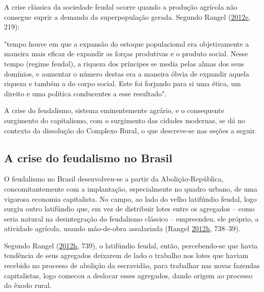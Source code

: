\documentclass[
	12pt,				%
	oneside,			%
	a4paper,			%
	chapter=TITLE,		%
	section=TITLE,		%
	english,			%
	brazil				%
	]{abntex2}
\begin{document}
A crise clássica da sociedade feudal ocorre quando a produção agrícola não
consegue suprir a demanda da superpopulação gerada. Segundo Rangel
(\protect\hyperlink{ref-rangel1961}{2012}\protect\hyperlink{ref-rangel1961}{e}, 219):
\begin{citacao} 
"tempo houve em que a expansão do estoque populacional era objetivamente a
maneira mais eficaz de expandir as forças produtivas e o produto social. Nesse
tempo (regime feudal), a riqueza dos príncipes se media pelas almas dos seus
domínios, e aumentar o número destas era a maneira óbvia de expandir aquela
riqueza e também a do corpo social. Este foi forjando para si uma ética, um
direito e uma política conducentes a esse resultado".
\end{citacao}
A crise do feudalismo, sistema eminentemente agrário, e o consequente surgimento
do capitalismo, com o surgimento das cidades modernas, se dá no contexto da
dissolução do Complexo Rural, o que descreve-se nas seções a seguir.

\hypertarget{a-crise-do-feudalismo-no-brasil}{%
\subsection{A crise do feudalismo no Brasil}\label{a-crise-do-feudalismo-no-brasil}}

O feudalismo no Brasil desenvolveu-se a partir da Abolição-República,
concomitantemente com a implantação, especialmente no quadro urbano, de uma
vigorosa economia capitalista. No campo, ao lado do velho latifúndio feudal,
logo surgiu outro latifúndio que, em vez de distribuir lotes entre os agregados
-- como seria natural na desintegração do feudalismo clássico -- empreendeu, ele
próprio, a atividade agrícola, usando mão-de-obra assalariada (Rangel \protect\hyperlink{ref-rangel1989}{2012}\protect\hyperlink{ref-rangel1989}{h}, 738--39).

Segundo Rangel (\protect\hyperlink{ref-rangel1989}{2012}\protect\hyperlink{ref-rangel1989}{h}, 739), o latifúndio feudal, então, percebendo-se
que havia tendência de seus agregados deixarem de lado o trabalho nos lotes
que haviam recebido no processo de abolição da escravidão, para trabalhar nas
novas fazendas capitalistas, logo comecou a deslocar esses agregados, dando
origem ao processo do êxodo rural.
\end{document}
